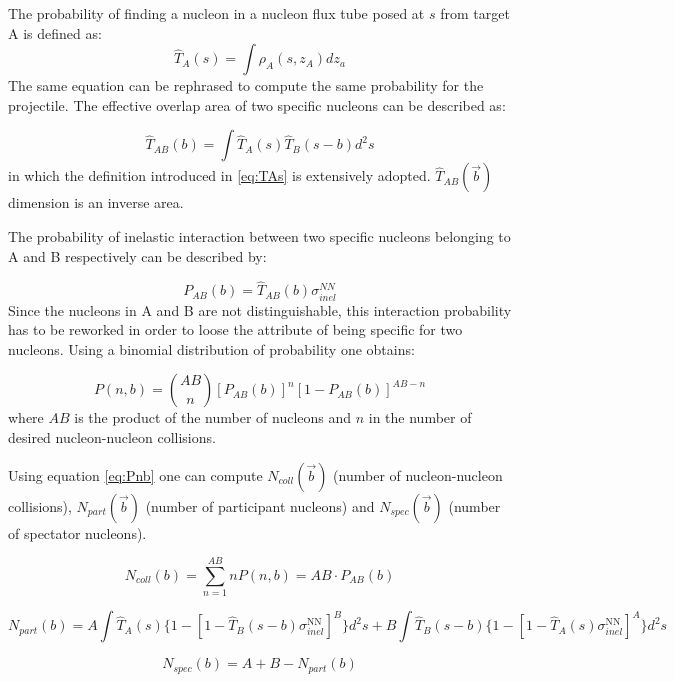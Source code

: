 The probability of finding a nucleon in a nucleon flux tube posed at $s$ from target A is defined as:\
\begin{equation}
\label{eq:TAs}
\hat{T}_A(s) = \int{\rho}_A(s,z_A)dz_a
\end{equation}
The same equation can be rephrased to compute the same probability for the projectile.
The effective overlap area of two specific nucleons can be described as:

\begin{equation}
\label{eq:TAB}
\hat{T}_{AB}(b) = \int\hat{T}_A(s)\hat{T}_B(s-b)d^2s
\end{equation}
in which the definition introduced in \ref{eq:TAs} is extensively adopted.
$\hat{T}_{AB}(\vec{b})$ dimension is an inverse area.

The probability of inelastic interaction between two specific nucleons belonging to A and B respectively can be described by:

\begin{equation}
\label{eq:PAB}
P_{AB}(b)=\hat{T}_{AB}(b)\sigma_{inel}^{NN}
\end{equation}
Since the nucleons in A and B are not distinguishable, this interaction probability has to be reworked in order to loose the attribute of being specific for two nucleons.
Using a binomial distribution of probability one obtains:

\begin{equation}
\label{eq:Pnb}
P(n,b)=\binom{AB}{n}[P_{AB}(b)]^n[1-P_{AB}(b)]^{AB-n}
\end{equation}
where $AB$ is the product of the number of nucleons and $n$ in the number of desired nucleon-nucleon collisions.

Using equation \ref{eq:Pnb} one can compute $N_{coll}(\vec{b})$ (number of nucleon-nucleon collisions), $N_{part}(\vec{b})$ (number of participant nucleons) and $N_{spec}(\vec{b})$ (number of spectator nucleons).

\begin{equation}
\label{eq:Ncoll}
N_{coll}(b)=\sum_{n=1}^{AB}nP(n,b)=AB\cdot P_{AB}(b)
\end{equation}

\begin{equation}
\label{eq:Npart}
N_{part}(b)=A\int\hat{T}_A(s)\{1-[1-\hat{T}_B(s-b)\sigma_{inel}^{\mathrm{NN}}]^B\}d^2s + B\int\hat{T}_B(s-b)\{1-[1-\hat{T}_A(s)\sigma_{inel}^{\mathrm{NN}}]^A\}d^2s
\end{equation}

\begin{equation}
\label{eq:Nspec}
N_{spec}(b)=A+B-N_{part}(b)
\end{equation}

